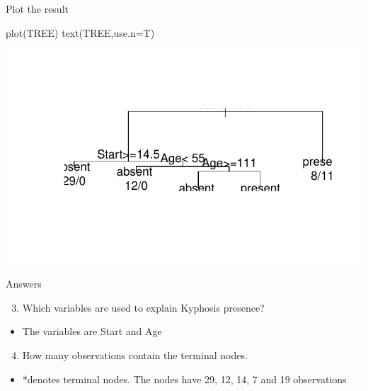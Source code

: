 \documentclass[
  10pt,
  ignorenonframetext,
]{beamer}
\newenvironment{Shaded}{}{}
\newcommand{\DataTypeTok}[1]{#1}
\newcommand{\KeywordTok}[1]{\textcolor[rgb]{0.00,0.00,1.00}{#1}}
\newcommand{\NormalTok}[1]{#1}
\providecommand{\tightlist}{%
  \setlength{\itemsep}{0pt}\setlength{\parskip}{0pt}}
\begin{document}
\begin{frame}[fragile]{Plot the result}
\protect\hypertarget{plot-the-result}{}

\begin{Shaded}
\begin{Highlighting}[]
\KeywordTok{plot}\NormalTok{(TREE)}
\KeywordTok{text}\NormalTok{(TREE,}\DataTypeTok{use.n=}\NormalTok{T)}
\end{Highlighting}
\end{Shaded}

\includegraphics{ml_exercises_c1_treesbagging_files/figure-beamer/unnamed-chunk-2-1.pdf}

\end{frame}

\begin{frame}{Answers}
\protect\hypertarget{answers}{}

\begin{enumerate}
[1)]
\setcounter{enumi}{2}
\tightlist
\item
  Which variables are used to explain Kyphosis presence?
\end{enumerate}

\begin{itemize}
\tightlist
\item
  The variables are Start and Age
\end{itemize}

\begin{enumerate}
[1)]
\setcounter{enumi}{3}
\tightlist
\item
  How many observations contain the terminal nodes.
\end{enumerate}

\begin{itemize}
\tightlist
\item
  *denotes terminal nodes. The nodes have 29, 12, 14, 7 and 19
  observations
\end{itemize}

\end{frame}
\end{document}
